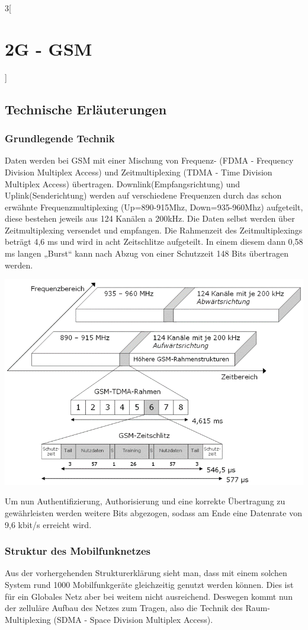 \begin{multicols}{3}[\section{2G - GSM}]
\subsection*{Technische Erläuterungen}
\subsubsection*{Grundlegende Technik}
Daten werden bei GSM mit einer Mischung von Frequenz- (FDMA - Frequency Division Multiplex Access) und Zeitmultiplexing (TDMA - Time Division Multiplex Access) übertragen. Downlink(Empfangsrichtung) und Uplink(Senderichtung) werden auf verschiedene Frequenzen durch das schon erwähnte Frequenzmultiplexing (Up=890-915Mhz, Down=935-960Mhz) aufgeteilt, diese bestehen jeweils aus 124 Kanälen a 200kHz. Die Daten selbst werden über Zeitmultiplexing versendet und empfangen. Die Rahmenzeit des Zeitmultiplexings beträgt 4,6 ms und wird in acht Zeitschlitze aufgeteilt. In einem diesem dann 0,58 ms langen „Burst“ kann nach Abzug von einer Schutzzeit 148 Bits übertragen werden.

\begin{Figure}
\includegraphics[width=\linewidth]{Kapitel/G2/Grafiken/GSM-Frequenzaufteilung.png}
\label{fig:G2.frequenzaufteilung}
\end{Figure}
\noindent
Um nun Authentifizierung, Authorisierung und eine korrekte Übertragung zu gewährleisten werden weitere Bits abgezogen, sodass am Ende eine Datenrate von 9,6 kbit/s erreicht wird. \cite{G2.1}\cite{G2.3}

\subsubsection*{Struktur des Mobilfunknetzes}
Aus der vorhergehenden Strukturerklärung sieht man, dass mit einem solchen System rund 1000 Mobilfunkgeräte gleichzeitig genutzt werden können. Dies ist für ein Globales Netz aber bei weitem nicht ausreichend. Deswegen kommt nun der zelluläre Aufbau des Netzes zum Tragen, also  die Technik des Raum-Multiplexing (SDMA - Space Division Multiplex Access).\cite{G2.2}


\end{multicols}

